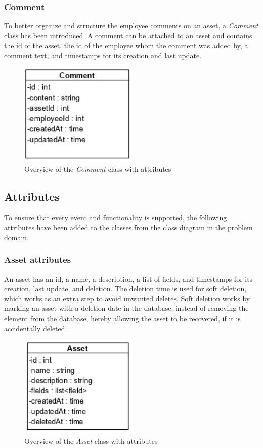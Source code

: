 \subsubsection{Comment}
To better organize and structure the employee comments on an asset, a \textit{Comment} class has been introduced. A comment can be attached to an asset and contains the id of the asset, the id of the employee whom the comment was added by, a comment text, and timestamps for its creation and last update.
\begin{figure}[H]
    \centering
    \includegraphics[width=0.5\textwidth]{figures/Classes/CommentAttributes.png}
    \caption{Overview of the \textit{Comment} class with attributes}
    \label{fig:CommentWithAttributes}
\end{figure}

\subsection{Attributes}
To ensure that every event and functionality is supported, the following attributes have been added to the classes from the class diagram in the problem domain.

\subsubsection{Asset attributes}
An asset has an id, a name, a description, a list of fields, and timestamps for its creation, last update, and deletion. The deletion time is used for soft deletion, which works as an extra step to avoid unwanted deletes. Soft deletion works by marking an asset with a deletion date in the database, instead of removing the element from the database, hereby allowing the asset to be recovered, if it is accidentally deleted.

\begin{figure}[H]
    \centering
    \includegraphics[width=0.5\textwidth]{figures/Classes/AssetAttributes.png}
    \caption{Overview of the \textit{Asset} class with attributes}
    \label{fig:AssetWithAttributes}
\end{figure}

